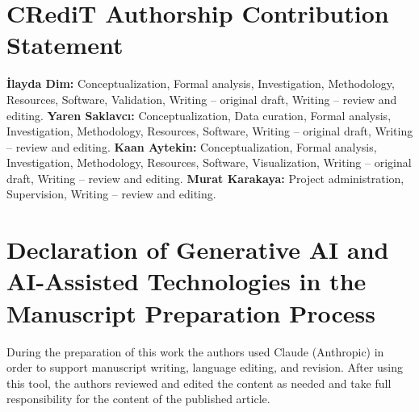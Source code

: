 \documentclass[a4paper,fleqn]{cas-sc}
\begin{document}
\section*{CRediT Authorship Contribution Statement}

\textbf{\.{I}layda Dim:} Conceptualization, Formal analysis, Investigation, Methodology, Resources, Software, Validation, Writing -- original draft, Writing -- review and editing. \textbf{Yaren Saklavc\i:} Conceptualization, Data curation, Formal analysis, Investigation, Methodology, Resources, Software, Writing -- original draft, Writing -- review and editing. \textbf{Kaan Aytekin:} Conceptualization, Formal analysis, Investigation, Methodology, Resources, Software, Visualization, Writing -- original draft, Writing -- review and editing. \textbf{Murat Karakaya:} Project administration, Supervision, Writing -- review and editing.

\section*{Declaration of Generative AI and AI-Assisted
Technologies in the Manuscript Preparation Process}

During the preparation of this work the authors used 
Claude (Anthropic) in order to support manuscript 
writing, language editing, and revision. After using 
this tool, the authors reviewed and edited the content 
as needed and take full responsibility for the content 
of the published article.

\clearpage


\end{document}
